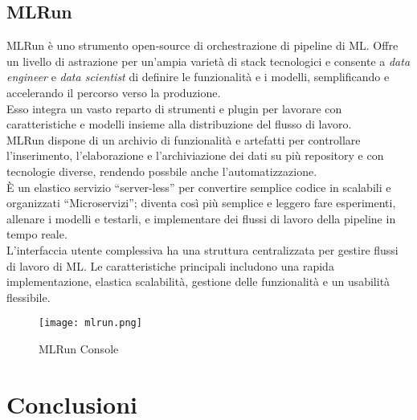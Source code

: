 \documentclass[../tesi.tex]{subfiles}
\begin{document}
\subsection{MLRun}
  MLRun è uno strumento open-source di orchestrazione di pipeline di ML. Offre un livello di astrazione per un'ampia varietà di stack tecnologici e consente a \textit{data engineer} e \textit{data scientist} di definire le funzionalità e i modelli, semplificando e accelerando il percorso verso la produzione.\\
  Esso integra un vasto reparto di strumenti e plugin per lavorare con caratteristiche e modelli insieme alla distribuzione del flusso di lavoro.\\
  MLRun dispone di un archivio di funzionalità e artefatti per controllare l’inserimento, l’elaborazione e l’archiviazione dei dati su più repository e con tecnologie diverse, rendendo possbile anche l'automatizzazione.\\
  È un elastico servizio ``\Gls{server-less}'' per convertire semplice codice in scalabili e organizzati ``\Gls{Microservizi}''; diventa così più semplice e leggero fare esperimenti, allenare i modelli e testarli, e implementare dei flussi di lavoro della pipeline in tempo reale.\\
  L’interfaccia utente complessiva ha una struttura centralizzata per gestire flussi di lavoro di ML. Le caratteristiche principali includono una rapida implementazione, elastica scalabilità, gestione delle funzionalità e un usabilità flessibile.\\
  \begin{figure}[htbp]
    \centering
    \texttt{[image: mlrun.png]} 
    \caption{MLRun Console}
    \end{figure}

\section{Conclusioni}
\end{document}
